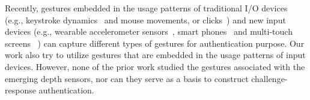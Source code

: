 Recently, gestures embedded in the usage patterns of traditional I/O devices (e.g., keystroke dynamics~\cite{Revett:springerlink:10,Monrose:CCS99} and mouse movements, or clicks~\cite{Ahmed:TPDS07,Jorgensen11mouse}) and new input devices (e.g., wearable accelerometer sensors~\cite{Gafurov2007},  smart phones~\cite{Uell:CCS13, Derawi:2013} and multi-touch screens~\cite{SaeBaeCHI2012,Sherman:2014} ) can capture different types of gestures for authentication purpose. %
Our work also try to utilize gestures that are embedded in the usage patterns of input devices. However, none of the prior work studied the gestures associated with the emerging depth sensors, nor can they serve as a basis to construct challenge-response authentication.



